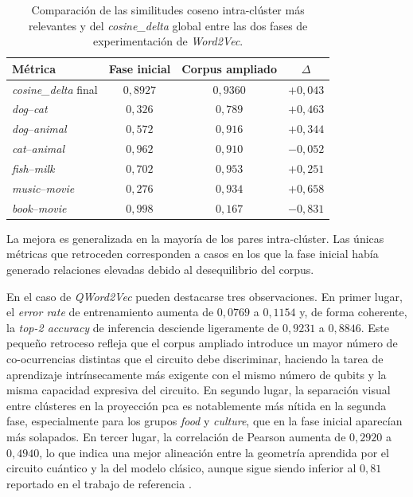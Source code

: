 \begin{table}[h]
  \centering
  \begin{tabular}{|l|c|c|c|}
    \hline
    \textbf{Métrica}               & \textbf{Fase inicial} & \textbf{Corpus ampliado} & $\Delta$   \\
    \hline
    \textit{cosine\_delta} final   & $0{,}8927$            & $0{,}9360$               & $+0{,}043$ \\
    \textit{dog}--\textit{cat}     & $0{,}326$             & $0{,}789$                & $+0{,}463$ \\
    \textit{dog}--\textit{animal}  & $0{,}572$             & $0{,}916$                & $+0{,}344$ \\
    \textit{cat}--\textit{animal}  & $0{,}962$             & $0{,}910$                & $-0{,}052$ \\
    \textit{fish}--\textit{milk}   & $0{,}702$             & $0{,}953$                & $+0{,}251$ \\
    \textit{music}--\textit{movie} & $0{,}276$             & $0{,}934$                & $+0{,}658$ \\
    \textit{book}--\textit{movie}  & $0{,}998$             & $0{,}167$                & $-0{,}831$ \\
    \hline
  \end{tabular}
  \caption{Comparación de las similitudes coseno intra-clúster más relevantes y del \textit{cosine\_delta} global entre las dos fases de experimentación de \textit{Word2Vec}.}
  \label{tab:comparacion_v1_v2}
\end{table}

La mejora es generalizada en la mayoría de los pares intra-clúster. Las únicas métricas que retroceden corresponden a casos en los que la fase inicial había generado relaciones elevadas debido al desequilibrio del corpus.

En el caso de \textit{QWord2Vec} pueden destacarse tres observaciones. En primer lugar, el \textit{error rate} de entrenamiento aumenta de $0{,}0769$ a $0{,}1154$ y, de forma coherente, la \textit{top-2 accuracy} de inferencia desciende ligeramente de $0{,}9231$ a $0{,}8846$. Este pequeño retroceso refleja que el corpus ampliado introduce un mayor número de co-ocurrencias distintas que el circuito debe discriminar, haciendo la tarea de aprendizaje intrínsecamente más exigente con el mismo número de qubits y la misma capacidad expresiva del circuito. En segundo lugar, la separación visual entre clústeres en la proyección \gls{pca} es notablemente más nítida en la segunda fase, especialmente para los grupos \textit{food} y \textit{culture}, que en la fase inicial aparecían más solapados. En tercer lugar, la correlación de Pearson aumenta de $0{,}2920$ a $0{,}4940$, lo que indica una mejor alineación entre la geometría aprendida por el circuito cuántico y la del modelo clásico, aunque sigue siendo inferior al $0{,}81$ reportado en el trabajo de referencia \cite{ohno_qword2vec_2025}.

